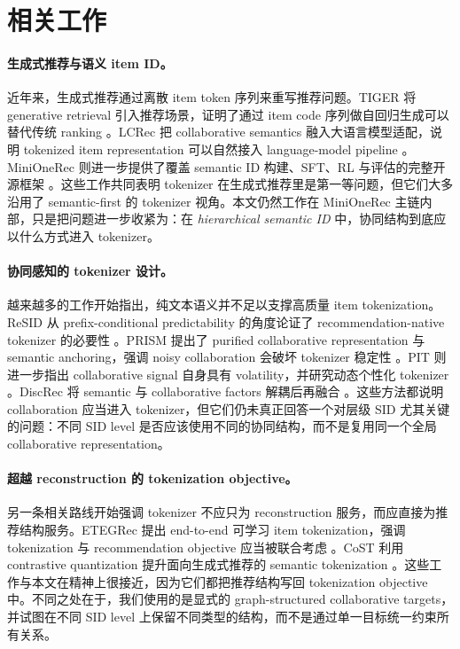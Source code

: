 \section{相关工作}
\label{sec:related}

\paragraph{生成式推荐与语义 item ID。}
近年来，生成式推荐通过离散 item token 序列来重写推荐问题。TIGER 将 generative retrieval 引入推荐场景，证明了通过 item code 序列做自回归生成可以替代传统 ranking \citep{rajput2023tiger}。LCRec 把 collaborative semantics 融入大语言模型适配，说明 tokenized item representation 可以自然接入 language-model pipeline \citep{zheng2023lcrec}。MiniOneRec 则进一步提供了覆盖 semantic ID 构建、SFT、RL 与评估的完整开源框架 \citep{kong2025minionerec}。这些工作共同表明 tokenizer 在生成式推荐里是第一等问题，但它们大多沿用了 semantic-first 的 tokenizer 视角。本文仍然工作在 MiniOneRec 主链内部，只是把问题进一步收紧为：在 \emph{hierarchical semantic ID} 中，协同结构到底应以什么方式进入 tokenizer。

\paragraph{协同感知的 tokenizer 设计。}
越来越多的工作开始指出，纯文本语义并不足以支撑高质量 item tokenization。ReSID 从 prefix-conditional predictability 的角度论证了 recommendation-native tokenizer 的必要性 \citep{liang2026resid}。PRISM 提出了 purified collaborative representation 与 semantic anchoring，强调 noisy collaboration 会破坏 tokenizer 稳定性 \citep{fang2026prism}。PIT 则进一步指出 collaborative signal 自身具有 volatility，并研究动态个性化 tokenizer \citep{wang2026pit}。DiscRec 将 semantic 与 collaborative factors 解耦后再融合 \citep{liu2025discrec}。这些方法都说明 collaboration 应当进入 tokenizer，但它们仍未真正回答一个对层级 SID 尤其关键的问题：不同 SID level 是否应该使用不同的协同结构，而不是复用同一个全局 collaborative representation。

\paragraph{超越 reconstruction 的 tokenization objective。}
另一条相关路线开始强调 tokenizer 不应只为 reconstruction 服务，而应直接为推荐结构服务。ETEGRec 提出 end-to-end 可学习 item tokenization，强调 tokenization 与 recommendation objective 应当被联合考虑 \citep{liu2024etegrec}。CoST 利用 contrastive quantization 提升面向生成式推荐的 semantic tokenization \citep{zhu2024cost}。这些工作与本文在精神上很接近，因为它们都把推荐结构写回 tokenization objective 中。不同之处在于，我们使用的是显式的 graph-structured collaborative targets，并试图在不同 SID level 上保留不同类型的结构，而不是通过单一目标统一约束所有关系。

